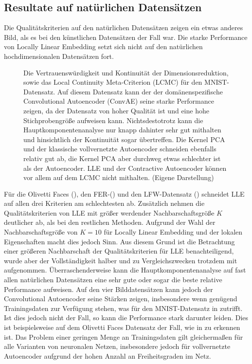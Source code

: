\subsection{Resultate auf natürlichen Datensätzen}
\label{ch:Vergleich:sec:Resultate:natuerlich}

Die Qualitätskriterien auf den natürlichen Datensätzen zeigen ein etwas anderes Bild, als es bei
den künstlichen Datensätzen der Fall war. Die starke Performance von Locally Linear Embedding setzt
sich nicht auf den natürlichen hochdimensionalen Datensätzen fort.
\begin{figure}[ht]
	\begin{center}
		
	\end{center}
	\caption[MNIST Qualitätskriterien]{Die Vertrauenswürdigkeit und Kontinuität der Dimensionsreduktion, sowie das Local Continuity Meta-Criterion (LCMC) für den MNIST-Datensatz. Auf diesem Datensatz kann der der domänenspezifische Convolutional Autoencoder (ConvAE) seine starke Performance zeigen, da der Datensatz von hoher Qualität ist und eine hohe Stichprobengröße aufweisen kann. Nichtsdestotrotz kann die Hauptkomponentenanalyse nur knapp dahinter sehr gut mithalten und hinsichtlich der Kontinuität sogar übertreffen. Die Kernel PCA und der klassische vollvernetzte Autoencoder schneiden ebenfalls relativ gut ab, die Kernel PCA aber durchweg etwas schlechter ist als der Autoencoder. LLE und der Contractive Autoencoder können vor allem auf dem LCMC nicht mithalten. (Eigene Darstellung)}
	\label{fig:MNISTMetrics}
\end{figure}
Für die Olivetti Faces (), den FER-() und den LFW-Datensatz ()
schneidet LLE auf allen drei Kriterien am schlechtesten ab. Zusätzlich nehmen die
Qualitätskriterien von LLE mit größer werdender Nachbarschaftsgröße $K$ deutlicher ab, als bei den
restlichen Methoden. Aufgrund der Wahl der Nachbarschaftsgröße von $K=10$ für Locally Linear
Embedding und der lokalen Eigenschaften macht dies jedoch Sinn. Aus diesem Grund ist die
Betrachtung einer größeren Nachbarschaft der Qualitätskriterien für LLE benachteiligend, wurde aber
der Vollständigkeit halber und zu Vergleichszwecken trotzdem mit aufgenommen. Überraschenderweise
kann die Hauptkomponentenanalyse auf fast allen natürlichen Datensätzen eine sehr gute oder sogar die
beste relative Performance aufweisen. Auf den vier Bilddatensätzen kann jedoch der Convolutional
Autoencoder seine Stärken zeigen, insbesondere wenn genügend Trainingsdaten zur Verfügung stehen, was für den MNIST-Datensatz in  zutrifft.
Ist dies jedoch nicht der Fall, so kann die Performance stark darunter leiden. Dies ist
beispielsweise auf dem Olivetti Faces Datensatz der Fall, wie in 
zu erkennen ist. Das Problem einer geringen Menge an Trainingsdaten gilt gleichermaßen für alle
Varianten von neuronalen Netzen, insbesondere jedoch für vollvernetzte Autoencoder aufgrund der
hohen Anzahl an Freiheitsgraden im Netz.

